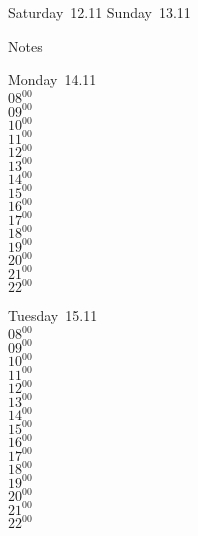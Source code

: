 \documentclass[11pt,a4paper]{book}\usepackage[]{graphicx}\usepackage[]{color}
\begin{document}
\begin{weekendbox}
  Saturday~12.11
  \tcblower
  Sunday~13.11
\end{weekendbox} %
\begin{notebox}
  Notes
\end{notebox}
\clearpage
\begin{headerbox}
\end{headerbox}
\begin{weekdaybox}
  Monday~14.11\\
  { 
  \vfill
  $08^{00}$\\
$09^{00}$\\
$10^{00}$\\
$11^{00}$\\
$12^{00}$\\
$13^{00}$\\
$14^{00}$\\
$15^{00}$\\
$16^{00}$\\
$17^{00}$\\
$18^{00}$\\
$19^{00}$\\
$20^{00}$\\
$21^{00}$\\
$22^{00}$\\
  }
\end{weekdaybox}
\begin{weekdaybox}
  Tuesday~15.11\\
  { 
  \vfill
  $08^{00}$\\
$09^{00}$\\
$10^{00}$\\
$11^{00}$\\
$12^{00}$\\
$13^{00}$\\
$14^{00}$\\
$15^{00}$\\
$16^{00}$\\
$17^{00}$\\
$18^{00}$\\
$19^{00}$\\
$20^{00}$\\
$21^{00}$\\
$22^{00}$\\
  }
\end{weekdaybox}
\end{document}
